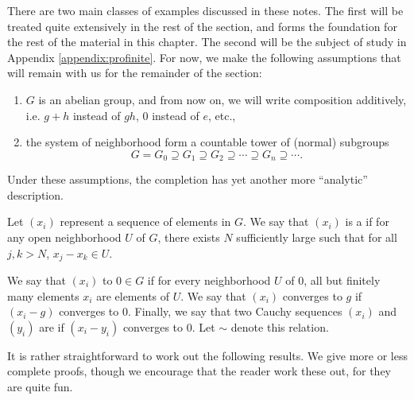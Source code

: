 There are two main classes of examples discussed in these notes.
The first will be treated quite extensively in the rest of the
section, and forms the foundation for the rest of the material in 
this chapter. The second will be the subject of study in Appendix 
\ref{appendix:profinite}. For now, we make the following 
assumptions that will remain with us for the remainder of the 
section:

\begin{enumerate}
\item $G$ is an abelian group, and from now on, we will write
composition additively, i.e. $g + h$ instead of $gh$, $0$ instead
of $e$, etc.,

\item the system of neighborhood form a countable tower of (normal)
subgroups
\[
G = G_0 \supseteq G_1 \supseteq G_2 \supseteq \cdots \supseteq G_n 
\supseteq \cdots.
\]

\end{enumerate}

Under these assumptions, the completion has yet another more 
``analytic'' description.

\begin{defn}
Let $(x_i)$ represent a sequence of elements in $G$. We say that
$(x_i)$ is a  if for
any open neighborhood $U$ of $G$, there exists $N$ sufficiently
large such that for all $j, k > N$, $x_j - x_k \in U$.

We say that $(x_i)$  
to $0 \in G$ if for every neighborhood $U$ of $0$, all but 
finitely many elements $x_i$ are elements of $U$. We say that
$(x_i)$ converges to $g$ if $(x_i - g)$ converges to $0$.
Finally, we say that two Cauchy sequences $(x_i)$ and $(y_i)$ are 
 if $(x_i - y_i)$
converges to $0$. Let $\sim$ denote this relation.
\end{defn}

It is rather straightforward to work out the following results.
We give more or less complete proofs, though we encourage that the 
reader work these out, for they are quite fun.

